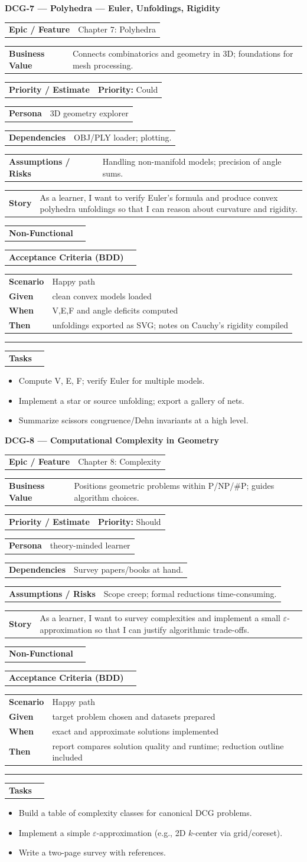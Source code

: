 \documentclass[11pt,a4paper]{article}
\makeatletter
\newcommand{\FieldRow}[2]{%
  \noindent\begin{tabularx}{\linewidth}{@{}>{\bfseries}l X@{}}#1 & #2\\\end{tabularx}%
}
\newcommand{\CardDivider}{\par\noindent\color{CardBorder}\rule{\linewidth}{0.4pt}\par\noindent\color{black}}
\newcommand{\StoryHeader}[2]{%
  {\large\bfseries \textcolor{CardTitle}{#1} --- #2}
}
\newcommand{\BDD}[4]{%
  \FieldRow{Acceptance Criteria (BDD)}{}
  \vspace{-0.75\baselineskip}
  \begin{tabularx}{\linewidth}{@{}>{\bfseries}l X@{}}
  Scenario & #1\\
  Given & #2\\
  When & #3\\
  Then & #4\\
  \end{tabularx}
}
\newenvironment{TaskList}{%
  \begin{itemize}[leftmargin=1.25em,label=\(\square\)]
}{\end{itemize}}
\makeatother
\begin{document}
\begin{StoryCardBox}
\StoryHeader{DCG-7}{Polyhedra — Euler, Unfoldings, Rigidity}\\[0.4em]
\FieldRow{Epic / Feature}{Chapter 7: Polyhedra}
\FieldRow{Business Value}{Connects combinatorics and geometry in 3D; foundations for mesh processing.}
\FieldRow{Priority / Estimate}{\textbf{Priority:} Could \quad \nfchip{SP: 5}}
\FieldRow{Persona}{3D geometry explorer}
\FieldRow{Dependencies}{OBJ/PLY loader; plotting.}
\FieldRow{Assumptions / Risks}{Handling non-manifold models; precision of angle sums.}
\FieldRow{Story}{As a learner, I want to verify Euler's formula and produce convex polyhedra unfoldings so that I can reason about curvature and rigidity.}

\FieldRow{Non-Functional}{\nfchip{Rigor} \nfchip{Clarity} \nfchip{Reproducibility}}

\BDD{Happy path}{clean convex models loaded}{V,E,F and angle deficits computed}{unfoldings exported as SVG; notes on Cauchy's rigidity compiled}

\CardDivider
\FieldRow{\large Tasks}{}
\begin{TaskList}
  \item Compute V, E, F; verify Euler for multiple models.
  \item Implement a star or source unfolding; export a gallery of nets.
  \item Summarize scissors congruence/Dehn invariants at a high level.
\end{TaskList}
\end{StoryCardBox}

\begin{StoryCardBox}
\StoryHeader{DCG-8}{Computational Complexity in Geometry}\\[0.4em]
\FieldRow{Epic / Feature}{Chapter 8: Complexity}
\FieldRow{Business Value}{Positions geometric problems within P/NP/\#P; guides algorithm choices.}
\FieldRow{Priority / Estimate}{\textbf{Priority:} Should \quad \nfchip{SP: 3}}
\FieldRow{Persona}{theory-minded learner}
\FieldRow{Dependencies}{Survey papers/books at hand.}
\FieldRow{Assumptions / Risks}{Scope creep; formal reductions time-consuming.}
\FieldRow{Story}{As a learner, I want to survey complexities and implement a small $\varepsilon$-approximation so that I can justify algorithmic trade-offs.}

\FieldRow{Non-Functional}{\nfchip{Rigor} \nfchip{Clarity} \nfchip{Reproducibility}}

\BDD{Happy path}{target problem chosen and datasets prepared}{exact and approximate solutions implemented}{report compares solution quality and runtime; reduction outline included}

\CardDivider
\FieldRow{\large Tasks}{}
\begin{TaskList}
  \item Build a table of complexity classes for canonical DCG problems.
  \item Implement a simple $\varepsilon$-approximation (e.g., 2D $k$-center via grid/coreset).
  \item Write a two-page survey with references.
\end{TaskList}
\end{StoryCardBox}
\end{document}
